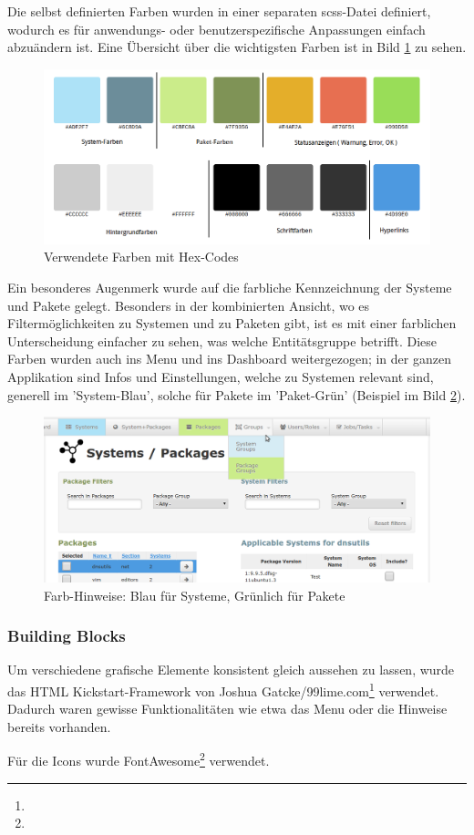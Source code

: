 Die selbst definierten Farben wurden in einer separaten \gls{scss}-Datei definiert, wodurch es für anwendungs- oder benutzerspezifische Anpassungen einfach abzuändern ist. Eine Übersicht über die wichtigsten Farben ist in Bild \ref{fig:design:colorcodes} zu sehen.

\begin{figure}[H]
	\centering
	\includegraphics[width=\linewidth]{files/colorcodes}
	\caption{Verwendete Farben mit Hex-Codes}
	\label{fig:design:colorcodes}
\end{figure}

Ein besonderes Augenmerk wurde auf die farbliche Kennzeichnung der Systeme und Pakete gelegt. Besonders in der kombinierten Ansicht, wo es Filtermöglichkeiten zu Systemen und zu Paketen gibt, ist es mit einer farblichen Unterscheidung einfacher zu sehen, was welche Entitätsgruppe betrifft. Diese Farben wurden auch ins Menu und ins Dashboard weitergezogen; in der ganzen Applikation sind Infos und Einstellungen, welche zu Systemen relevant sind, generell im 'System-Blau', solche für Pakete im 'Paket-Grün' (Beispiel im Bild \ref{fig:design:sys_pkg_colors}).

\begin{figure}[H]
	\centering
	\includegraphics[width=\linewidth]{files/colors_pkg_sys}
	\caption{Farb-Hinweise: Blau für Systeme, Grünlich für Pakete}
	\label{fig:design:sys_pkg_colors}
\end{figure}

\subsubsection*{Building Blocks}

Um verschiedene grafische Elemente konsistent gleich aussehen zu lassen, wurde das HTML Kickstart-Framework von Joshua Gatcke/99lime.com\footnote{} verwendet. Dadurch waren gewisse Funktionalitäten wie etwa das Menu oder die Hinweise bereits vorhanden.


Für die Icons wurde FontAwesome\footnote{} verwendet.
